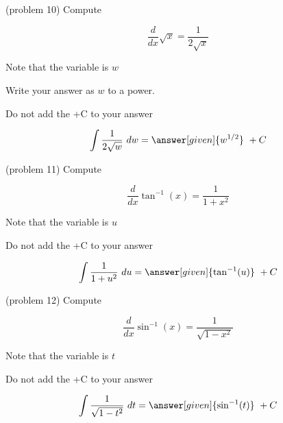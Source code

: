 \documentclass[handout]{ximera}
\begin{document}
\begin{problem}(problem 10)
Compute 

\begin{hint}
\[
\frac{d}{dx} \sqrt x = \frac{1}{2\sqrt x}
\]
\end{hint}
\begin{hint}
Note that the variable is $w$
\end{hint}
\begin{hint}
Write your answer as $w$ to a power.
\end{hint}
\begin{hint}
\begin{center}
Do not add the +C to your answer
\end{center}
\end{hint}

\[
\int \frac{1}{2\sqrt w} \ dw =
\answer[given]{w^{1/2}} \ + C
\]
\end{problem}





\begin{problem}(problem 11)
Compute 

\begin{hint}
\[
\frac{d}{dx} \tan^{-1}(x) = \frac{1}{1+x^2}
\]
\end{hint}
\begin{hint}
Note that the variable is $u$
\end{hint}
\begin{hint}
\begin{center}
Do not add the +C to your answer
\end{center}
\end{hint}

\[
\int \frac{1}{1+u^2} \ du =
\answer[given]{\tan^{-1}(u)} \ + C
\]
\end{problem}




\begin{problem}(problem 12)
Compute 

\begin{hint}
\[
\frac{d}{dx} \sin^{-1}(x) = \frac{1}{\sqrt{1 - x^2}}
\]
\end{hint}
\begin{hint}
Note that the variable is $t$
\end{hint}
\begin{hint}
\begin{center}
Do not add the +C to your answer
\end{center}
\end{hint}

\[
\int \frac{1}{\sqrt{1 - t^2}} \ dt =
\answer[given]{\sin^{-1}(t)} \ + C
\]
\end{problem}
\end{document}
